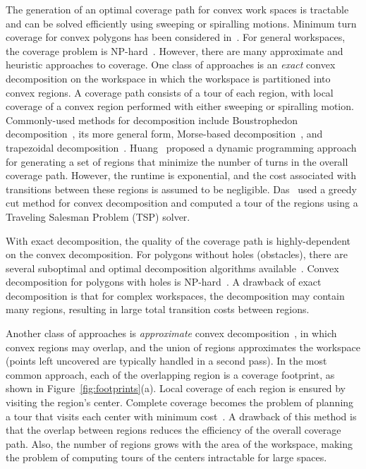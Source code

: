 \documentclass[../main.tex]{subfiles}
\begin{document}
The generation of an optimal coverage path for convex work spaces is tractable and can be solved efficiently using sweeping or spiralling motions. Minimum turn coverage for convex polygons has been considered in~\cite{maza2007multiple}.  For general workspaces, the coverage problem is NP-hard~\cite{arkin2000approximation}. However, there are many approximate and heuristic approaches to coverage. One class of approaches is an \emph{exact} convex decomposition on the workspace in which the workspace is partitioned into convex regions. A coverage path consists of a tour of each region, with local coverage of a convex region performed with either sweeping or spiralling motion. Commonly-used methods for decomposition include Boustrophedon decomposition~\cite{Choset1998coverage}, its more general form, Morse-based decomposition~\cite{Acar2002morse}, and trapezoidal decomposition~\cite{Oksanen2009coverage}. Huang~\cite{Huang2001optimal} proposed a dynamic programming approach for generating a set of regions that minimize the number of turns in the overall coverage path. However, the runtime is exponential, and the cost associated with transitions between these regions is assumed to be negligible. Das~\cite{das2014mapping} used a greedy cut method for convex decomposition and computed a tour of the regions using a Traveling Salesman Problem (TSP) solver.

With exact decomposition, the quality of the coverage path is highly-dependent on the convex decomposition. For polygons without holes (obstacles), there are several suboptimal and optimal decomposition algorithms available~\cite{keil2000polygon}. Convex decomposition for polygons with holes is NP-hard~\cite{lingas1982power}. A drawback of exact decomposition is that for complex workspaces, the decomposition may contain many regions, resulting in large total transition costs between regions.

Another class of approaches is \emph{approximate} convex decomposition~\cite{Galceran2013surveycpp}, in which convex regions may overlap, and the union of regions approximates the workspace (points left uncovered are typically handled in a second pass). In the most common approach, each of the overlapping region is a coverage footprint, as shown in Figure~\ref{fig:footprints}(a). Local coverage of each region is ensured by visiting the region's center. Complete coverage becomes the problem of planning a tour that visits each center with minimum cost~\cite{arkin2000approximation}. A drawback of this method is that the overlap between regions reduces the efficiency of the overall coverage path. Also, the number of regions grows with the area of the workspace, making the problem of computing tours of the centers intractable for large spaces.
\end{document}
